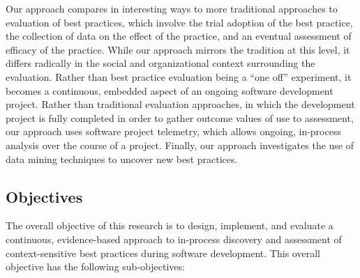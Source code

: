 Our approach compares in interesting ways to more traditional approaches to
evaluation of best practices, which involve the trial adoption of the best
practice, the collection of data on the effect of the practice, and an
eventual assessment of efficacy of the practice.  While our approach
mirrors the tradition at this level, it differs radically in the social and
organizational context surrounding the evaluation.  Rather than best
practice evaluation being a ``one off'' experiment, it becomes a
continuous, embedded aspect of an ongoing software development project.
Rather than traditional evaluation approaches, in which the development
project is fully completed in order to gather outcome values of use to
assessment, our approach uses software project telemetry, which allows
ongoing, in-process analysis over the course of a project.  Finally, our approach
investigates the use of data mining techniques to uncover new best
practices.  

\subsection{Objectives}

The overall objective of this research is to design, implement, and
evaluate a continuous, evidence-based approach to in-process discovery and
assessment of context-sensitive best practices during software development.
This overall objective has the following sub-objectives: 

